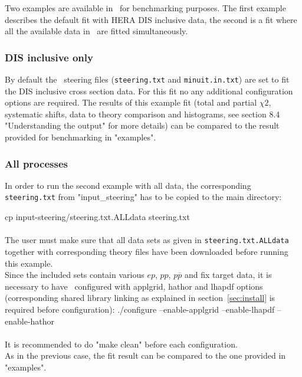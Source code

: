
\label{section:example}
Two examples are available in \fitter\ for benchmarking purposes.
The first example describes the default fit with HERA DIS inclusive data,
the second is a fit where all the available data in \fitter\ are fitted simultaneously.

\subsubsection{DIS inclusive only}
By default the \fitter\ steering files ({\tt steering.txt} and {\tt minuit.in.txt})
are set to fit the DIS inclusive cross section data. For this fit no any additional
configuration options are required.
The results of this example fit (total and partial $\chi2$, systematic shifts, 
data to theory comparison and histograms, see section 8.4 "Understanding the output" for more details) 
can be compared to the result provided for benchmarking in "examples".

\subsubsection{All processes}
In order to run the second example with all data, the corresponding
{\tt steering.txt} from "input\_steering" has to be copied to the main directory:

\goodbreak                 
cp input-steering/steering.txt.ALLdata steering.txt
\\ \\
The user must make sure that all data sets as given in {\tt steering.txt.ALLdata} together with corresponding theory files have been downloaded  
before running this example. 
\\
Since the included sets contain various $ep$, $pp$, $p \overline p$ and fix target
data, it is necessary to have \fitter\ configured with applgrid, hathor and 
lhapdf options (corresponding shared library linking as explained in section~\ref{sec:install} is
required before configuration): 
\goodbreak
./configure --enable-applgrid --enable-lhapdf --enable-hathor
\\ \\
It is recommended to do "make clean" before each configuration. \\        
As in the previous case, the fit result can be compared to the one provided in "examples".



